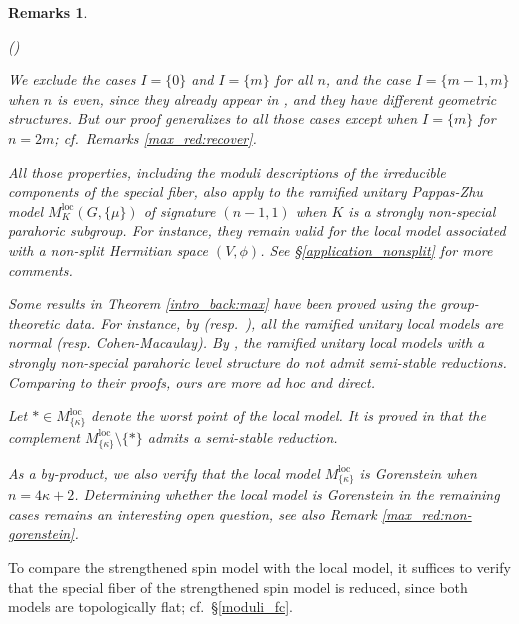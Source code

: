 \documentclass[pdflatex,sn-mathphys-num]{sn-jnl}%
\theoremstyle{thmstyleone}%
\theoremstyle{thmstyletwo}%
\newtheorem{remarks}[subsubsection]{Remarks}%
\numberwithin{equation}{subsection}
\theoremstyle{thmstylethree}%
\newcommand{\loc}{\ensuremath{\mathrm{loc}}\xspace}
\newenvironment{altenumerate}
	{\begin{list}
			{(\theenumi) }
			{\usecounter{enumi}
				\setlength{\labelwidth}{0pt}
				\setlength{\labelsep}{0pt}
				\setlength{\leftmargin}{0pt}
				\setlength{\itemsep}{\the\smallskipamount}
				\renewcommand{\theenumi}{\roman{enumi}}
		}}
		{\end{list}}
\begin{document}
\begin{remarks}
\begin{altenumerate}
\item We exclude the cases $I=\{0\}$ and $I=\{m\}$ for all $n$, and the case $I=\{m-1,m\}$ when $n$ is even, since they already appear in \cite{Pappas2000,Smithling2015,Yu2019}, and they have different geometric structures.
But our proof generalizes to all those cases except when $I=\{m\}$ for $n=2m$; cf.\ Remarks \ref{max_red:recover}.
\item All those properties, including the moduli descriptions of the irreducible components of the special fiber, also apply to the ramified unitary Pappas-Zhu model $M_K^\loc(G,\{\mu\})$ of signature $(n-1,1)$ when $K$ is a strongly non-special parahoric subgroup. For instance, they remain valid for the local model associated with a non-split Hermitian space $(V,\phi)$. See \S \ref{application_nonsplit} for more comments.
\item Some results in Theorem \ref{intro_back:max} have been proved using the group-theoretic data. For instance, by \cite{PZ2013} (resp.\ \cite{HR22}), all the ramified unitary local models are normal (resp. Cohen-Macaulay). By \cite{HPR}, the ramified unitary local models with a strongly non-special parahoric level structure do not admit semi-stable reductions. Comparing to their proofs, ours are more ad hoc and direct.

\item Let $*\in M^{\loc}_{\{\kappa\}}$ denote the worst point of the local model. It is proved in \cite[Corollary 1.3.2]{HLS-regular} that the complement $M^{\loc}_{\{\kappa\}}\setminus \{*\}$ admits a semi-stable reduction.

\item As a by-product, we also verify that the local model $M^\loc_{\{\kappa\}}$ is Gorenstein when $n=4\kappa+2$. Determining whether the local model is Gorenstein in the remaining cases remains an interesting open question, see also Remark \ref{max_red:non-gorenstein}.
\end{altenumerate}
\end{remarks}

To compare the strengthened spin model with the local model,  it suffices to verify that the special fiber of the strengthened spin model is reduced, since both models are topologically flat; cf.\ \S \ref{moduli_fc}.
\end{document}
